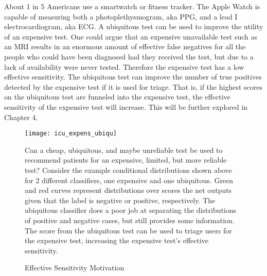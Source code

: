About 1 in 5 Americans use a smartwatch or fitness tracker.  The Apple Watch is capable of measuring both a photoplethysmogram, aka PPG, and a lead I electrocardiogram, aka ECG. A ubiquitous test can be used to improve the utility of an expensive test.  One could argue that an expensive unavailable test such as an MRI results in an enormous amount of effective false negatives for all the people who could have been diagnosed had they received the test, but due to a lack of availability were never tested.  Therefore the expensive test has a low effective sensitivity.  The ubiquitous test can improve the number of true positives detected by the expensive test if it is used for triage.  That is, if the highest scores on the ubiquitous test are funneled into the expensive test, the effective sensitivity of the expensive test will increase.  This will be further explored in Chapter 4.

\begin{figure}[h]
\begin{center}
\texttt{[image: icu\_expens\_ubiqu]}
\end{center}
\caption{Effective Sensitivity Motivation}
\vspace{12px}
Can a cheap, ubiquitous, and maybe unreliable test be used to recommend patients for an expensive, limited, but more reliable test?  Consider the example conditional distributions shown above for 2 different classifiers, one expensive and one ubiquitous.  Green and red curves represent distributions over scores the net outputs given that the label is negative or positive, respectively.  The ubiquitous classifier does a poor job at separating the distributions of positive and negative cases, but still provides some information.  The score from the ubiquitous test can be used to triage users for the expensive test, increasing the expensive test's effective sensitivity.
\label{fig:icu_expens_ubiqu}
\end{figure}


